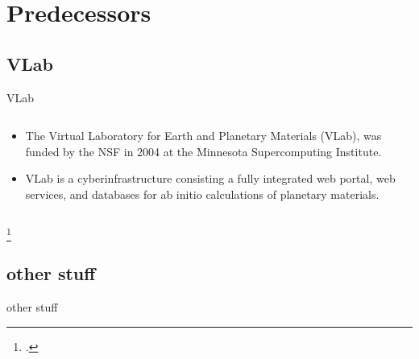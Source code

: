 \section{Predecessors}

\subsection{VLab}

\begin{frame}{VLab}
    \begin{columns}[t]
        \begin{column}{0.4\textwidth}
            \begin{itemize}
                \item The Virtual Laboratory for Earth and Planetary Materials (VLab), was
                      funded by the NSF in 2004 at the Minnesota Supercomputing Institute.
                \item VLab is a cyberinfrastructure consisting a fully integrated web
                      portal, web services, and databases for ab initio calculations of
                      planetary materials.
            \end{itemize}
        \end{column}

        \begin{column}{0.6\textwidth}
        \end{column}
    \end{columns}
    \footcitetext{DASILVA2007321}

\end{frame}

\subsection{other stuff}

\begin{frame}{other stuff}

\end{frame}
